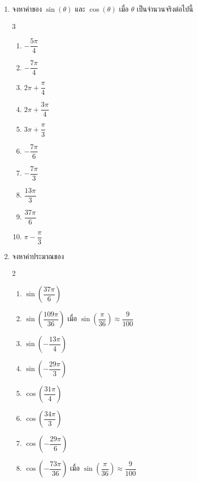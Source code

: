 \begin{enumerate}[label=\arabic*., leftmargin=*, itemsep=1em]
 	\begin{enumerate}[label=\theenumi\arabic*), leftmargin=1.5em, itemsep=0.6em]
 		\everymath{\displaystyle}
 	 \begin{multicols}{2}
 		\item $\dfrac{5\pi}{3}$
 		\item $\dfrac{7\pi}{6}$
 		\item $\dfrac{9\pi}{5}$
 		\item $\dfrac{7\pi}{10}$
 		\item $-\dfrac{37\pi}{12}$
 		\item $-\dfrac{16\pi}{7}$
 	 \end{multicols}	
 	\end{enumerate}
 
 \item จงหาค่าของ $\sin \left( \theta \right)$ และ $\cos \left( \theta \right)$ เมื่อ $\theta$ เป็นจำนวนจริงต่อไปนี้
 \begin{multicols}{3}
 	\begin{enumerate}[label=\theenumi\arabic*), leftmargin=1.5em]
 		\everymath{\displaystyle}
 		\item $-\dfrac{5\pi}{4}$
 		\item $-\dfrac{7\pi}{4}$
 		\item $2\pi + \dfrac{\pi}{4}$
 		\item $2\pi + \dfrac{3\pi}{4}$
 		\item $3\pi + \dfrac{\pi}{3}$
 		\item $-\dfrac{7\pi}{6}$
 		\item $-\dfrac{7\pi}{3}$
 		\item $\dfrac{13\pi}{3}$
 		\item $\dfrac{37\pi}{6}$
 		\item $\pi - \dfrac{\pi}{3}$
 	\end{enumerate}
 \end{multicols}
 
 \item จงหาค่าประมาณของ
 \begin{multicols}{2}
 	\begin{enumerate}[label=\theenumi\arabic*), leftmargin=1.5em, itemsep=0.6em]
 		\everymath{\displaystyle}
 		\item $\sin \left( \dfrac{37\pi}{6} \right)$
 		\item $\sin \left( \dfrac{109\pi}{36} \right)$ เมื่อ $\sin \left( \dfrac{\pi}{36} \right) \approx \dfrac{9}{100}$
 		\item $\sin \left( -\dfrac{13\pi}{4} \right)$
 		\item $\sin \left( -\dfrac{29\pi}{3} \right)$
 		\item $\cos \left( \dfrac{31\pi}{4} \right)$
 		\item $\cos \left( \dfrac{34\pi}{3} \right)$
 		\item $\cos \left( -\dfrac{29\pi}{6} \right)$
 		\item $\cos \left( -\dfrac{73\pi}{36} \right)$ เมื่อ $\sin \left( \dfrac{\pi}{36} \right) \approx \dfrac{9}{100}$
 	\end{enumerate}
 \end{multicols}
 

\end{enumerate}
